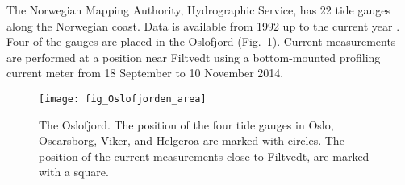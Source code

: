 

The Norwegian Mapping Authority, Hydrographic Service, has 22 tide gauges along the Norwegian coast. Data is available from 1992 up to the current year \cite[]{tide16}. Four of the gauges are placed in the Oslofjord  (Fig.~\ref{fig:area1}). %
Current measurements are performed at a position near Filtvedt using a bottom-mounted profiling current meter from 18 September to 10 November 2014.

\begin{figure}[htb]
\centering
\texttt{[image: fig\_Oslofjorden\_area]}
\caption{The Oslofjord. The position of the four tide gauges in Oslo, Oscarsborg, Viker, and Helgeroa are marked with circles. The position of the current measurements close to Filtvedt, are marked with a square.}
\label{fig:area1}
\end{figure}


